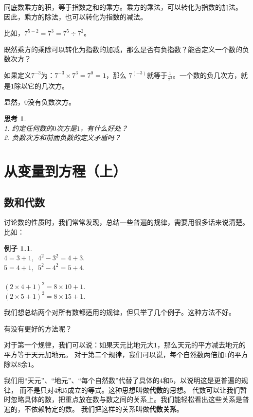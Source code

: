 \documentclass[12pt,UTF8]{ctexbook}
\newtheorem{ex}{例子}[section]
\newtheorem{sk}{思考}[section]
\begin{document}
同底数乘方的积，等于指数之和的乘方。乘方的乘法，可以转化为指数的加法。
因此，乘方的除法，也可以转化为指数的减法。

比如，$7^{5-2} = 7^3 = 7^5 \div 7^2$。

既然乘方的乘除可以转化为指数的加减，那么是否有负指数？能否定义一个数的负数次方？

如果定义$7^{-3}$为：$7^{-3} \times 7^3 = 7^{0} = 1$，那么
$7^{(-3)}$就等于$\frac{1}{7^3}$。一个数的负几次方，就是$1$除以它的几次方。

显然，$0$没有负数次方。

\begin{sk}\label{sk:0-2-0}
    \mbox{}\\
    1. 约定任何数的$0$次方是$1$，有什么好处？\\
    2. 负数次方和前面负数的定义矛盾吗？
\end{sk}

\chapter{从变量到方程（上）}

\section{数和代数}
讨论数的性质时，我们常常发现，总结一些普遍的规律，需要用很多话来说清楚。比如：
\begin{ex}\label{ex:1-0-0}
    \mbox{} \\ 
    \indent $4 = 3 + 1,\,\,\, 4^2 - 3^2 = 4 + 3.$ \\
    \indent $5 = 4 + 1, \,\,\,5^2 - 4^2 = 5 + 4.$\\
    \mbox{}\\
    \indent $(2 \times 4 + 1)^2 = 8 \times 10 + 1.$\\
    \indent $(2 \times 5 + 1)^2 = 8 \times 15 + 1.$
\end{ex}
我们想总结两个对所有数都适用的规律，但只举了几个例子。这种方法不好。

有没有更好的方法呢？

对于第一个规律，我们可以说：如果天元比地元大$1$，那么天元的平方减去地元的平方等于天元加地元。
对于第二个规律，我们可以说，每个自然数两倍加$1$的平方除以$8$余$1$。

我们用“天元”、“地元”、“每个自然数”代替了具体的$4$和$5$，以说明这是更普遍的规律，
而不是只对$4$和$5$成立的等式。这种思想叫做\textbf{代数}的思想。
代数可以让我们暂时忽略具体的数，把重点放在数与数之间的关系上。我们能轻松看出这些关系是普遍的，不依赖特定的数。
我们把这样的关系叫做\textbf{代数关系}。
\end{document}

